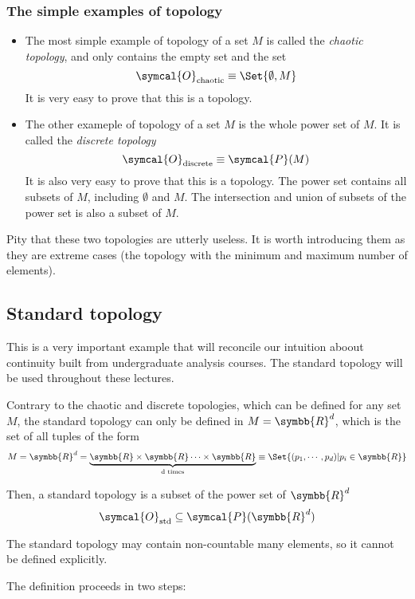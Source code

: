 \subsubsection{The simple examples of topology}
\begin{itemize}
\item The most simple example of topology of a set $M$ is called the \emph{chaotic topology}, and only
  contains the empty set and the set
  \[
    \symcal{O}_{\text{chaotic}} \equiv \Set{\emptyset, M}
  \]
  It is very easy to prove that this is a topology.
\item The other exameple of topology of a set $M$ is the whole power set of $M$. It is called the
  \emph{discrete topology}
  \[
    \symcal{O}_{\text{discrete}} \equiv \symcal{P}(M)
  \]
  It is also very easy to prove that this is a topology. The power set contains all subsets of
  $M$, including $\emptyset$ and $M$. The intersection and union of subsets of the power set is
  also a subset of $M$.
\end{itemize}
Pity that these two topologies are utterly useless. It is worth introducing them as they are
extreme cases (the topology with the minimum and maximum number of elements).

\subsection{Standard topology}
This is a very important example that will reconcile our intuition aboout continuity built from
undergraduate analysis courses. The standard topology will be used throughout these lectures.

Contrary to the chaotic and discrete topologies, which can be defined for any set $M$, the standard
topology can only be defined in $M = \symbb{R}^d$, which is the set of all tuples of the form
\[
  M = \symbb{R}^d
  = \underbrace{\symbb{R}\times\symbb{R}\cdots\times\symbb{R}}_{\text{d times}}
  \equiv \Set{(p_1, \cdots, p_d) | p_i\in\symbb{R}}
\]

Then, a standard topology is a subset of the power set of $\symbb{R}^d$
\[
  \symcal{O}_{\text{std}} \subseteq \symcal{P}(\symbb{R}^d)
\]

The standard topology may contain non-countable many elements, so it cannot be defined explicitly.

The definition proceeds in two steps:

